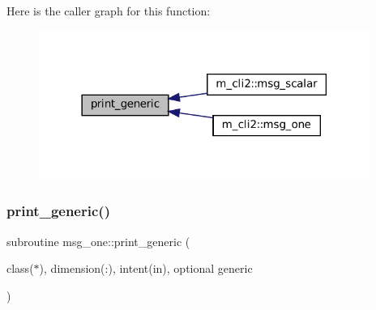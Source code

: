 Here is the caller graph for this function\+:
\nopagebreak
\begin{figure}[H]
\begin{center}
\leavevmode
\includegraphics[width=306pt]{M__CLI2_8f90_aaa8ee15f943d8e1543ae35ab732c3cd2_icgraph}
\end{center}
\end{figure}
\mbox{\label{M__CLI2_8f90_a9d5e1620d474ac03a74eeb9b0f7d6ae1}} 
\subsubsection{\texorpdfstring{print\+\_\+generic()}{print\_generic()}\hspace{0.1cm}{\footnotesize\ttfamily [2/2]}}
{\footnotesize\ttfamily subroutine msg\+\_\+one\+::print\+\_\+generic (\begin{DoxyParamCaption}\item[{class($\ast$), dimension(\+:), intent(in), optional}]{generic }\end{DoxyParamCaption})\hspace{0.3cm}{\ttfamily [private]}}

